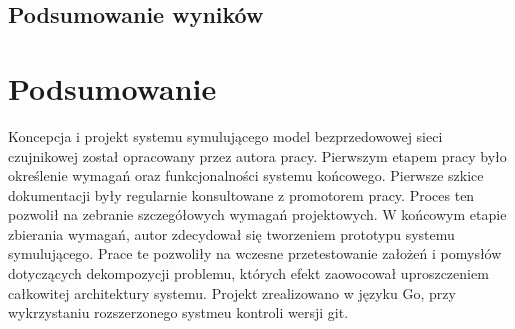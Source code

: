 \documentclass[a4paper,12pt,twoside,openany]{report}
\begin{document}
\section{Podsumowanie wyników}


\chapter{Podsumowanie}
Koncepcja i projekt systemu symulującego model bezprzedowowej sieci czujnikowej został opracowany przez autora pracy.
Pierwszym etapem pracy było określenie wymagań oraz funkcjonalności systemu końcowego. Pierwsze szkice dokumentacji były regularnie konsultowane z promotorem pracy.
Proces ten pozwolił na zebranie szczegółowych wymagań projektowych. W końcowym etapie zbierania wymagań, autor zdecydował się tworzeniem prototypu systemu symulującego.
Prace te pozwoliły na wczesne przetestowanie założeń i pomysłów dotyczących dekompozycji problemu, których efekt zaowocował uproszczeniem całkowitej architektury systemu.
Projekt zrealizowano w języku Go, przy wykrzystaniu rozszerzonego systmeu kontroli wersji git.


\begin{thebibliography}{99}
\end{thebibliography}

\zakonczenie  %
\end{document}
